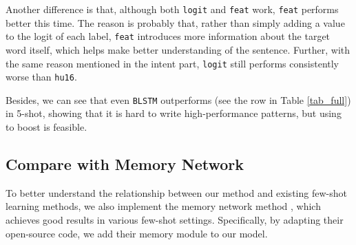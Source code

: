 Another difference is that, although both \texttt{logit} and \texttt{feat} work, \texttt{feat} performs better this time. The reason is probably that, rather than simply adding a value to the logit of each label, \texttt{feat} introduces more information about the target word itself, which helps \NN make better understanding of the sentence. Further, with the same reason mentioned in the intent part, \texttt{logit} still performs consistently worse than \texttt{hu16}.


Besides, we can see that even \texttt{BLSTM} outperforms \RE (see the \RE row in Table \ref{tab_full}) in 5-shot, showing that it is hard to write high-performance \RE patterns, but using \RE to boost \NN is feasible. 


\subsection{Compare with Memory Network}
To better understand the relationship between our method and existing few-shot learning methods, we also implement the memory network method \cite{kaiser2017learning}, which achieves good results in various few-shot settings. Specifically, by adapting their open-source code, we add their memory module to our \BLSTM model.

